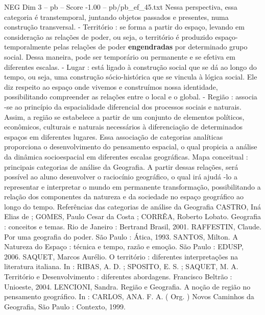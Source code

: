 \begin{textsample}{NEG Dim 3 – pb – Score -1.00 – pb/pb\_ef\_45.txt}
Nessa perspectiva, essa categoria é transtemporal, juntando objetos passados e presentes, numa construção transversal. - Território : se forma a partir do espaço, levando em consideração as relações de poder, ou seja, o território é produzido espaço-temporalmente pelas relações de poder \textbf{engendradas} por determinado grupo social.
Dessa maneira, pode ser temporário ou permanente e se efetiva em diferentes escalas. - Lugar : está ligado à construção social que se dá ao longo do tempo, ou seja, uma construção sócio-histórica que se vincula à lógica social.
Ele diz respeito ao espaço onde vivemos e construímos nossa identidade, possibilitando compreender as relações entre o local e o global. - Região : associa -se ao princípio da espacialidade diferencial dos processos sociais e naturais.
Assim, a região se estabelece a partir de um conjunto de elementos políticos, econômicos, culturais e naturais necessários à diferenciação de determinados espaços em diferentes lugares.
Essa associação de categorias analíticas proporciona o desenvolvimento do pensamento espacial, o qual propicia a análise da dinâmica socioespacial em diferentes escalas geográficas.
Mapa conceitual : principais categorias de análise da Geografia.
A partir dessas relações, será possível ao aluno desenvolver o raciocínio geográfico, o qual irá ajudá -lo a representar e interpretar o mundo em permanente transformação, possibilitando a relação dos componentes da natureza e da sociedade no espaço geográfico ao longo do tempo.
Referências das categorias de análise da Geografia CASTRO, Iná Elias de ; GOMES, Paulo Cesar da Costa ; CORRÊA, Roberto Lobato.
Geografia : conceitos e temas.
Rio de Janeiro : Bertrand Brasil, 2001.
RAFFESTIN, Claude.
Por uma geografia do poder.
São Paulo : Ática, 1993.
SANTOS, Milton.
A Natureza do Espaço : técnica e tempo, razão e emoção.
São Paulo : EDUSP, 2006.
SAQUET, Marcos Aurélio.
O território : diferentes interpretações na literatura italiana.
In : RIBAS, A.
D. ; SPOSITO, E.
S. ; SAQUET, M.
A.
Território e Desenvolvimento : diferentes abordagens.
Francisco Beltrão : Unioeste, 2004.
LENCIONI, Sandra.
Região e Geografia.
A noção de região no pensamento geográfico.
In : CARLOS, ANA.
F.
A. ( Org. ) Novos Caminhos da Geografia, São Paulo : Contexto, 1999.

\end{textsample}
